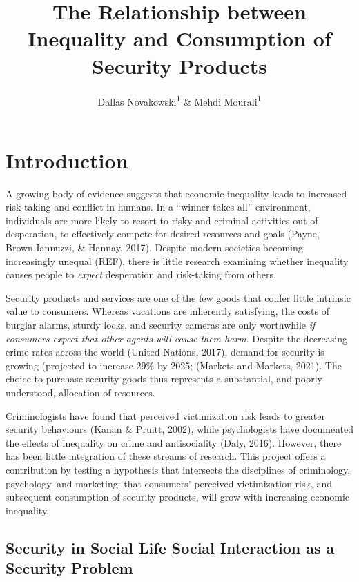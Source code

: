\documentclass[
  english,
  man]{apa6}
\title{The Relationship between Inequality and Consumption of Security Products}
\author{Dallas Novakowski\textsuperscript{1} \& Mehdi Mourali\textsuperscript{1}}
\date{}
\affiliation{\vspace{0.5cm}\textsuperscript{1} University of Calgary, Haskayne School of Business}
\begin{document}
\maketitle

\hypertarget{introduction}{%
\section{Introduction}\label{introduction}}

A growing body of evidence suggests that economic inequality leads to increased risk-taking and conflict in humans. In a ``winner-takes-all'' environment, individuals are more likely to resort to risky and criminal activities out of desperation, to effectively compete for desired resources and goals (Payne, Brown-Iannuzzi, \& Hannay, 2017). Despite modern societies becoming increasingly unequal (REF), there is little research examining whether inequality causes people to \emph{expect} desperation and risk-taking from others.

Security products and services are one of the few goods that confer little intrinsic value to consumers. Whereas vacations are inherently satisfying, the costs of burglar alarms, sturdy locks, and security cameras are only worthwhile \emph{if consumers expect that other agents will cause them harm}. Despite the decreasing crime rates across the world (United Nations, 2017), demand for security is growing (projected to increase 29\% by 2025; (Markets and Markets, 2021). The choice to purchase security goods thus represents a substantial, and poorly understood, allocation of resources.

Criminologists have found that perceived victimization risk leads to greater security behaviours (Kanan \& Pruitt, 2002), while psychologists have documented the effects of inequality on crime and antisociality (Daly, 2016). However, there has been little integration of these streams of research. This project offers a contribution by testing a hypothesis that intersects the disciplines of criminology, psychology, and marketing: that consumers' perceived victimization risk, and subsequent consumption of security products, will grow with increasing economic inequality.

\hypertarget{security-in-social-life-social-interaction-as-a-security-problem}{%
\subsection{Security in Social Life Social Interaction as a Security Problem}\label{security-in-social-life-social-interaction-as-a-security-problem}}
\end{document}
